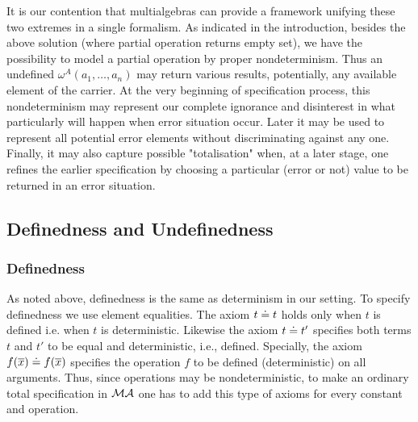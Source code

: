 \documentclass[10pt]{article}
\begin{document}
It is our contention that multialgebras can provide a framework unifying
these two extremes in a single formalism.  As indicated in the introduction,
besides the above solution (where partial operation returns empty set), we
have the possibility to model a partial operation by proper
nondeterminism. Thus an undefined $\omega^A(a_1, \ldots ,a_n)$ may return
various results, potentially, any available element of the carrier. At the
very beginning of specification process, this nondeterminism may represent
our complete ignorance and disinterest in what particularly will happen when
error situation occur. Later it may be used to represent all potential error
elements without discriminating against any one. Finally, it may also capture
possible "totalisation" when, at a later stage, one refines the earlier
specification by choosing a particular (error or not) value to be returned in
an error situation.

\subsection{Definedness and Undefinedness}

\subsubsection{Definedness}
As noted above, definedness is the same as determinism in our setting. To
specify definedness we use element equalities. The axiom $t \mathrel{\dot{=} } t$ holds
only when $t$ is defined i.e. when $t$ is deterministic. Likewise the
axiom $t \mathrel{\dot{=} } t'$ specifies both terms $t$ and $t'$ to be equal and
deterministic, i.e., defined. Specially,
the axiom $f(\overline{x}) \mathrel{\dot{=} } f(\overline{x})$ specifies the operation
$f$ to be defined (deterministic) on all arguments. Thus, since operations may be
nondeterministic, to make an ordinary
total specification in ${\mathcal{MA}}$ one has to add this type of axioms for
every constant and operation.
\end{document}
